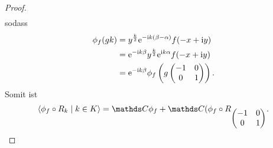 \begin{proof}
\begin{align*}
\end{align*}
sodass
\begin{align*}
\phi_f(gk)&=y^{\frac{k}{2}} \mathrm{e}^{-\mathrm{i}k (\beta-\alpha)} f(-x+\mathrm{i}y)\\
&=\mathrm{e}^{-\mathrm{i}k\beta} y^{\frac{k}{2}} \mathrm{e}^{\mathrm{i}k\alpha} f(-x+\mathrm{i}y)\\
&=\mathrm{e}^{-\mathrm{i}k \beta} \phi_f\left(g\begin{pmatrix}
-1 &0\\
0 &1
\end{pmatrix} \right).
\end{align*}
Somit ist
\begin{align*}
\langle \phi_f \circ R_k \mid k\in K \rangle =\C \phi_f +\C(\phi_f \circ R_{\begin{pmatrix}
-1 &0\\
0 &1
\end{pmatrix}}.
\end{align*}
\end{proof}

